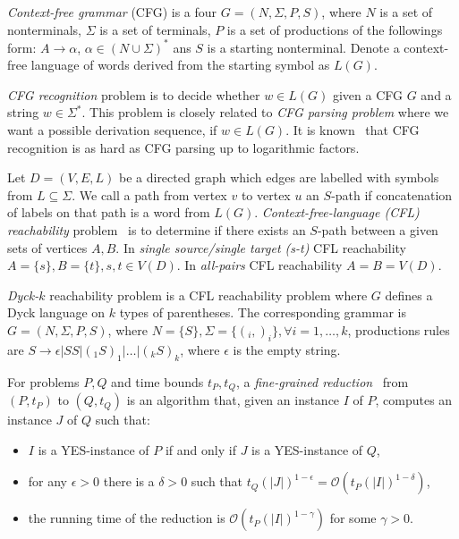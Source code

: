\documentclass[acmsmall,review,nonacm]{acmart}\settopmatter{printfolios=true,printccs=false,printacmref=false}
\begin{document}
	\emph{Context-free grammar} (CFG) is a four $G=(N, \Sigma, P, S)$, where $N$ is a set of nonterminals, $\Sigma$ is a set of terminals, $P$ is a set of productions of the followings form: $A \to \alpha$, $\alpha \in (N \cup \Sigma)^*$ ans $S$ is a starting nonterminal. Denote a context-free language of words derived from the starting symbol as $L(G)$.
	
	\emph{CFG recognition} problem is to decide whether $w \in L(G)$ given a CFG $G$ and a string $w \in \Sigma^*$. This problem is closely related to \emph{CFG parsing problem} where we want a possible derivation sequence, if $w \in L(G)$. It is known~\cite{10.5555/646233.682379} that CFG recognition is as hard as CFG parsing up to logarithmic factors.
	
	Let $D = (V, E, L)$ be a directed graph which edges are labelled with symbols from $L \subseteq \Sigma$. We call a path from vertex $v$ to vertex $u$ an $S$-path if concatenation of labels on that path is a word from $L(G)$.  \emph{Context-free-language (CFL) reachability} problem~\cite{10.1145/258994.259006} is to determine if there exists an $S$-path between a given sets of vertices $A, B$. In \emph{single source/single target (s-t)} CFL reachability $A = \{s\}, B = \{t\}, s, t \in V(D)$. In \emph{all-pairs} CFL reachability $A = B = V(D)$.
	
	\emph{Dyck-$k$} reachability problem is a CFL reachability problem where $G$ defines a Dyck language on $k$ types of parentheses. The corresponding grammar is $G=(N, \Sigma, P, S)$, where $N = \{S\}, \Sigma = \{(_i, )_i\}, \forall i = 1, \ldots, k$, productions rules are $S \rightarrow \epsilon | SS | (_1 S )_1 | \ldots | (_k S )_k$, where $\epsilon$ is the empty string. 
	
	For problems $P, Q$ and time bounds $t_P, t_Q$, a \emph{fine-grained reduction}~\cite{bringmann2019fine} from $(P, t_P)$ to $(Q, t_Q)$ is an algorithm that, given an instance $I$ of $P$, computes an instance $J$ of $Q$ such that: 
	
	\begin{itemize}
		\item $I$ is a YES-instance of $P$ if and only if $J$ is a YES-instance of $Q$,
		\item for any $\epsilon > 0$ there is a $\delta > 0$ such that $t_Q(|J|)^{1 - \epsilon} = \mathcal{O}(t_P (|I|)^{1 - \delta})$, 
		\item the running time of the reduction is $\mathcal{O}(t_P (|I|)^{1 - \gamma})$ for some $\gamma > 0$.
	\end{itemize}
	
\end{document}
